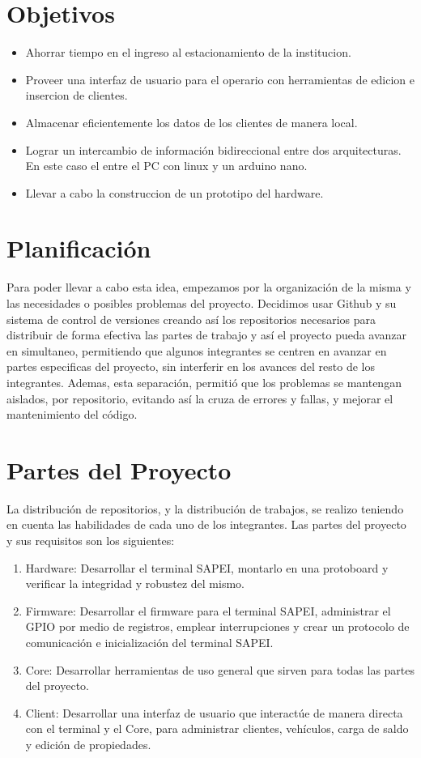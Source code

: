 \documentclass[a4paper, 12pt]{report}
\begin{document}
\section{Objetivos}
    \begin{itemize}
        \item Ahorrar tiempo en el ingreso al estacionamiento de la institucion.
        \item Proveer una interfaz de usuario para el operario con herramientas de edicion e insercion de clientes.
        \item Almacenar eficientemente los datos de los clientes de manera local.
        \item Lograr un intercambio de información bidireccional entre dos arquitecturas. En este caso el entre el PC
            con linux y un arduino nano.
        \item Llevar a cabo la construccion de un prototipo del hardware.
    \end{itemize}

\newpage
\section{Planificación}
    Para poder llevar a cabo esta idea, empezamos por la organización de la misma y las necesidades o posibles
    problemas del proyecto. Decidimos usar Github y su sistema de control de versiones
    creando así los repositorios necesarios para distribuir de forma efectiva las partes de trabajo y así el proyecto
    pueda avanzar en simultaneo, permitiendo que algunos integrantes se centren en avanzar en partes especificas
    del proyecto, sin interferir en los avances del resto de los integrantes. Ademas, esta separación, permitió que
    los problemas se mantengan aislados, por repositorio, evitando así la cruza de errores y fallas, y mejorar el
    mantenimiento del código.

\section{Partes del Proyecto}
    La distribución de repositorios, y la distribución de trabajos, se realizo teniendo en cuenta las habilidades de
    cada uno de los integrantes. Las partes del proyecto y sus requisitos son los siguientes:
    \begin{enumerate}
        \item Hardware: Desarrollar el terminal SAPEI, montarlo en una protoboard y verificar la integridad y robustez
            del mismo.
        \item Firmware: Desarrollar el firmware para el terminal SAPEI, administrar el GPIO por medio de registros,
            emplear interrupciones y crear un protocolo de comunicación e inicialización del terminal SAPEI.
        \item Core: Desarrollar herramientas de uso general que sirven para todas las partes del proyecto.
        \item Client: Desarrollar una interfaz de usuario que interactúe de manera directa con el terminal y el Core,
            para administrar clientes, vehículos, carga de saldo y edición de propiedades.
    \end{enumerate}
\end{document}
